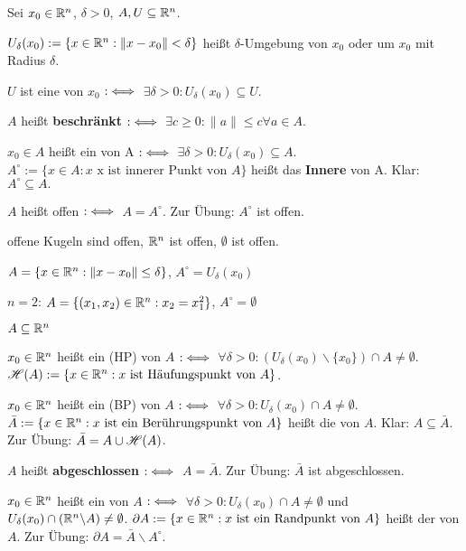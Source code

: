 \documentclass[a4paper,twoside,DIV15,BCOR12mm,chapterprefix=true,headings=twolinechapter]{scrbook}
\begin{document}
\begin{definition}
Sei $x_0 \in \mathbb{R}^n$, $\delta > 0$, $A, U\subseteq \mathbb{R}^n$.
\begin{liste}
 \item $U_\delta(x_0) := \{ x \in \mathbb{R}^n: \|x-x_0\|<\delta\}$ heißt $\delta$-Umgebung von $x_0$ oder  um $x_0$ mit Radius $\delta$.
 \item $U$ ist eine  von $x_0$ $:\iff$ $\exists \delta > 0 : U_\delta(x_0) \subseteq U$.
 \item {}$A$ heißt \textbf{beschränkt} $:\iff$ $\exists c \ge 0: \|a\|\le c \forall a\in A$.
 \item $x_0\in A$ heißt ein  von A $:\iff$ $\exists \delta>0: U_\delta(x_0) \subseteq A$. \\
   $A^\circ:=\{ x\in A: x \text{ x ist innerer Punkt von }A\}$ heißt das \textbf{Innere} von A. Klar: $A^\circ\subseteq A.$
 \item $A$ heißt offen $:\iff$ $A=A^\circ$. Zur Übung: $A^\circ$ ist offen.
\end{liste}
\end{definition}

\begin{beispiele}
 \item offene Kugeln sind offen, $\mathbb{R}^n$ ist offen, $\emptyset$ ist offen.
 \item $A=\{x\in\mathbb{R}^n: \|x-x_0\|\le \delta\}$, $A^\circ = U_\delta(x_0)$
 \item $n=2$: $A=\{(x_1,x_2)\in\mathbb{R}^n: x_2 = x_1^2\}$, $A^\circ=\emptyset$
\end{beispiele}

\begin{definition}
 $A\subseteq \mathbb{R}^n$
 \begin{liste}
 \item $x_0\in \mathbb{R}^n$ heißt ein  (HP) von $A$ $:\iff$ $\forall \delta > 0: (U_\delta(x_0) \backslash \{x_0\}) \cap A \ne \emptyset$. $\mathscr{H}(A) := \{ x\in\mathbb{R}^n: x \text{ ist Häufungspunkt von } A\}$.
 \item  $x_0\in\mathbb{R}^n$ heißt ein  (BP) von $A$ $:\iff$ $\forall\delta>0: U_\delta(x_0) \cap A \ne \emptyset$. $\bar{A}:=\{x\in\mathbb{R}^n: x \text{ ist ein Berührungspunkt von } A\}$ heißt die  von $A$. Klar: $A\subseteq\bar{A}$. Zur Übung: $\bar{A} = A \cup \mathscr{H}(A)$.
 \item {}$A$ heißt \textbf{abgeschlossen} $:\iff$ $A=\bar{A}$. Zur Übung: $\bar{A}$ ist abgeschlossen.
 \item $x_0\in\mathbb{R}^n$ heißt ein  von $A$ $:\iff$ $\forall\delta>0: U_\delta(x_0) \cap A \ne \emptyset$ und $U_\delta(x_0) \cap (\mathbb{R}^n\backslash A) \ne \emptyset$. $\partial A := \{x\in\mathbb{R}^n: x \text{ ist ein Randpunkt von } A \}$ heißt der  von $A$. Zur Übung: $\partial A = \bar{A}\backslash A^\circ$.
 \end{liste}
\end{definition}
\end{document}
